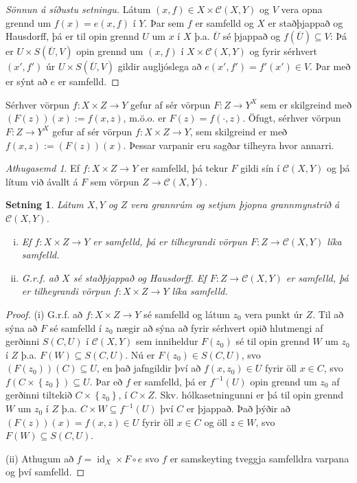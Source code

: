 \documentclass[a4paper,icelandic]{book}
\theoremstyle{definition}
\theoremstyle{plain}
\newtheorem{setn}{Setning}[section]
\theoremstyle{remark}
\newtheorem*{ath}{Athugasemd}
\DeclareMathOperator{\id}{id} %
\begin{document}
\begin{proof}
  [Sönnun á síðustu setningu]
  Látum $(x,f)\in X\times\mathcal C(X,Y)$ og $V$ vera opna grennd um
  $f(x)=e(x,f)$ í $Y$. Þar sem $f$ er samfelld og $X$ er staðþjappað og
  Hausdorff, þá er til opin grennd $U$ um $x$ í $X$ þ.a. $\overline U$
  sé þjappað og $f(\overline U)\subseteq V$: Þá er $U\times S(\overline
  U,V)$ opin grennd um $(x,f)$ í $X\times\mathcal C(X,Y)$ og fyrir
  sérhvert $(x',f')$ úr $U\times S(\overline U,V)$ gildir augljóslega að
  $e(x',f')=f'(x')\in V$. Þar með er sýnt að $e$ er samfelld.
\end{proof}
Sérhver vörpun $f: X\times Z\to Y$ gefur af sér vörpun $F:Z\to Y^X$ sem
er skilgreind með $(F(z))(x):=f(x,z)$, m.ö.o. er $F(z) = f(\cdot,z)$.
Öfugt, sérhver vörpun $F:Z\to Y^X$ gefur af sér vörpun $f:X\times Z\to
Y$, sem skilgreind er með $f(x,z):=(F(z))(x)$. Þessar varpanir eru
sagðar tilheyra hvor annarri. 
\begin{ath}
  Ef $f:X\times Z\to Y$ er samfelld, þá tekur $F$ gildi sín í $\mathcal
  C(X,Y)$ og þá lítum við ávallt á $F$ sem vörpun $Z\to \mathcal
  C(X,Y)$.
\end{ath}
\begin{setn}
  Látum $X,Y$ og $Z$ vera grannrúm og setjum þjopna grannmynstrið á
  $\mathcal C(X,Y)$.
  \begin{enumerate}[(i)]
    \item Ef $f:X\times Z\to Y$ er samfelld, þá er tilheyrandi vörpun
      $F:Z\to \mathcal C(X,Y)$ líka samfelld.
    \item G.r.f. að $X$ sé staðþjappað og Hausdorff. Ef $F:Z\to\mathcal
      C(X,Y)$ er samfelld, þá er tilheyrandi vörpun $f:X\times Z\to Y$
      líka samfelld.
  \end{enumerate}
\end{setn}
\begin{proof}
  (i) G.r.f. að $f:X\times Z\to Y$ sé samfelld og látum $z_0$ vera
  punkt úr $Z$. Til að sýna að $F$ sé samfelld í $z_0$ nægir að sýna að
  fyrir sérhvert opið hlutmengi af gerðinni $S(C,U)$ í $\mathcal C(X,Y)$
  sem inniheldur $F(z_0)$ sé til opin grennd $W$ um $z_0$ í $Z$ þ.a.
  $F(W)\subseteq S(C,U)$. Nú er $F(z_0)\in S(C,U)$, svo
  $(F(z_0))(C)\subseteq U$, en það jafngildir því að $f(x,z_0)\in U$
  fyrir öll $x\in C$, svo $f(C\times\left\{ z_0 \right\})\subseteq U$.
  Þar eð $f$ er samfelld, þá er $f^{-1}(U)$ opin grennd um $z_0$ af
  gerðinni tiltekið $C\times\left\{ z_0 \right\}$, í $C\times Z$. Skv.
  hólkasetningunni er þá til opin grennd $W$ um $z_0$ í $Z$ þ.a.
  $C\times W\subseteq f^{-1}(U)$ því $C$ er þjappað. Það þýðir að
  $(F(z))(x) = f(x,z)\in U$ fyrir öll $x\in C$ og öll $z\in W$, svo
  $F(W)\subseteq S(C,U)$.

  (ii) Athugum að $f = \id_X\times F\circ e$
  svo $f$ er samskeyting tveggja samfelldra varpana og því samfelld.
\end{proof}
\end{document}
